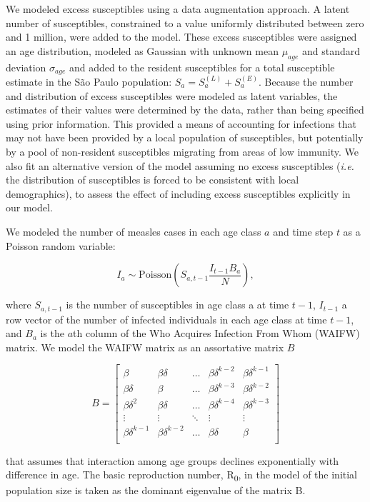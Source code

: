 We modeled excess susceptibles using a data augmentation approach. A latent number of susceptibles, constrained to a value uniformly distributed between zero and 1 million, were added to the model. These excess susceptibles were assigned an age distribution, modeled as Gaussian with unknown mean \(\mu_{age}\) and standard deviation \(\sigma_{age}\) and added to the resident susceptibles for a total susceptible estimate in the S\~{a}o Paulo population: \(S_a = S_a^{(L)} + S_a^{(E)}\). Because the number and distribution of excess susceptibles were modeled as latent variables, the estimates of their values were determined by the data, rather than being specified using prior information. This provided a means of accounting for infections that may not have been provided by a local population of susceptibles, but potentially by a pool of non-resident susceptibles migrating from areas of low immunity. We also fit an alternative version of the model assuming no excess susceptibles (\emph{i.e.} the distribution of susceptibles is forced to be consistent with local demographics), to assess the effect of including excess susceptibles explicitly in our model.

We modeled the number of measles cases in each age class \(a\) and time step \(t\) as a Poisson random variable:

\[I_a \sim \text{Poisson}\left(S_{a,t-1} \frac{I_{t-1}B_a}{N} \right),\] 

where \(S_{a,t-1}\) is the number of susceptibles in age class a at time \(t-1\), \(I_{t-1}\) a row vector of the number of infected individuals in each age class at time \(t-1\), and \(B_a\) is the \(a\)th column of the Who Acquires Infection From Whom (WAIFW) matrix.  We model the WAIFW matrix as an assortative matrix \(B\)

\[B = \left[{
\begin{array}{ccccc}
  {\beta} & {\beta \delta} & \ldots & {\beta \delta^{k-2}} & {\beta \delta^{k-1}}  \\
  {\beta \delta} & {\beta} & \ldots & {\beta \delta^{k-3}} & {\beta \delta^{k-2}} \\
{\beta \delta^2} & {\beta \delta} & \ldots & {\beta \delta^{k-4}} & {\beta \delta^{k-3}}  \\
  \vdots & \vdots & \ddots & \vdots & \vdots \\
  {\beta \delta^{k-1}} & {\beta \delta^{k-2}} & \ldots & {\beta \delta} & {\beta}  \\
\end{array}
}\right]\]

that assumes that interaction among age groups declines exponentially with difference in age. The basic reproduction number, R\textsubscript{0}, in the model of the initial population size is taken as the dominant eigenvalue of the matrix B.
